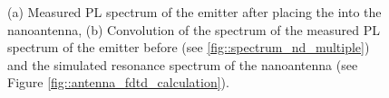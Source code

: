 			\begin{figure}[htp]
				\begin{subfigure}[t]{ 0.49\linewidth}
					\centering
					\caption{}
					\label{subfig::spectrum_antenna_nd_multiple}
				\end{subfigure}
				\hfill
				\begin{subfigure}[t]{ 0.49\linewidth}
					\centering
					\caption{}
					\label{subfig::antenna_convolution}
				\end{subfigure}
				\caption{(a) Measured PL spectrum of the emitter after placing the \nd into the nanoantenna, (b) Convolution of the spectrum of the measured PL spectrum of the emitter before \pp (see \autoref{fig::spectrum_nd_multiple}) and the simulated resonance spectrum of the nanoantenna (see Figure \autoref{fig::antenna_fdtd_calculation}).}
			\end{figure}

